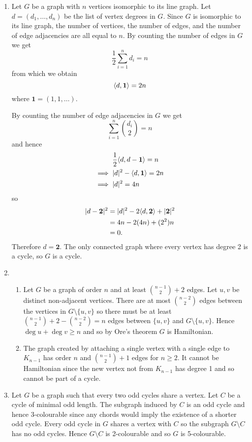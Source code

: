 \documentclass[a4paper, 12pt]{article}
\DeclarePairedDelimiter\abs{\lvert}{\rvert}
\DeclarePairedDelimiter\inner{\langle}{\rangle}
\begin{document}
\begin{enumerate}
\item Let \(G\) be a graph with \(n\) vertices isomorphic to its line graph. Let \(d=(d_1,\dots,d_n)\) be the list of vertex degrees in \(G\). Since \(G\) is isomorphic to its line graph, the number of vertices, the number of edges, and the number of edge adjacencies are all equal to \(n\). By counting the number of edges in \(G\) we get
\[\frac12\sum_{i=1}^n d_i=n\]
from which we obtain
\[\inner{d,\bm1}=2n\]
where \(\bm1=(1,1,\dots)\).

By counting the number of edge adjacencies in \(G\) we get
\[\sum_{i=1}^n\binom{d_i}2=n\]
and hence
\begin{align*}
&\frac12\inner{d,d-\bm1}=n\\
\implies{}&\abs{d}^2-\inner{d,\bm1}=2n\\
\implies{}&\abs{d}^2=4n
\end{align*}
so
\begin{align*}
\abs{d-\bm2}^2&=\abs{d}^2-2\inner{d,\bm2}+\abs{\bm2}^2\\
&=4n-2(4n)+(2^2)n\\
&=0.
\end{align*}
Therefore \(d=\bm2\). The only connected graph where every vertex has degree 2 is a cycle, so \(G\) is a cycle.

\item \begin{enumerate}

\item Let \(G\) be a graph of order \(n\) and at least \(\binom{n-1}2+2\) edges. Let \(u,v\) be distinct non-adjacent vertices. There are at most \(\binom{n-2}2\) edges between the vertices in \(G\setminus \{u,v\}\) so there must be at least \(\binom{n-1}2+2-\binom{n-2}2=n\) edges between \(\{u,v\}\) and \(G\setminus \{u,v\}\). Hence \(\deg u+\deg v\geq n\) and so by Ore's theorem \(G\) is Hamiltonian.

\item The graph created by attaching a single vertex with a single edge to \(K_{n-1}\) has order \(n\) and \(\binom{n-1}2+1\) edges for \(n\geq2\). It cannot be Hamiltonian since the new vertex not from \(K_{n-1}\) has degree 1 and so cannot be part of a cycle.

\end{enumerate}

\item Let \(G\) be a graph such that every two odd cycles share a vertex. Let \(C\) be a cycle of minimal odd length. The subgraph induced by \(C\) is an odd cycle and hence 3-colourable since any chords would imply the existence of a shorter odd cycle. Every odd cycle in \(G\) shares a vertex with \(C\) so the subgraph \(G\setminus C\) has no odd cycles. Hence \(G\setminus C\) is 2-colourable and so \(G\) is 5-colourable.

\end{enumerate}
\end{document}
